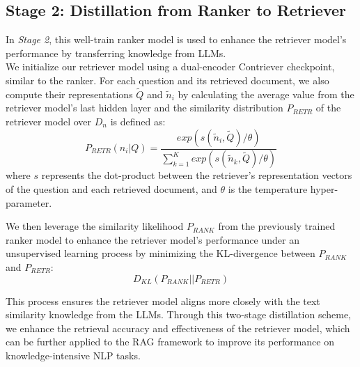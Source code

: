 \subsection{Stage 2: Distillation from Ranker to Retriever}
\label{sec:3-3}
In \textit{Stage 2}, this well-train ranker model is used to enhance the retriever model's performance by transferring knowledge from LLMs.\\
We initialize our retriever model using a dual-encoder Contriever checkpoint, similar to the ranker.
For each question and its retrieved document, we also compute their representations $\widetilde{Q}$ and $\widetilde{n}_i$ by calculating the average value from the retriever model's last hidden layer and the similarity distribution $P_{RETR}$ of the retriever model over $D_n$ is defined as:
\begin{equation}
    P_{RETR}(n_i|Q) = \frac{exp(s(\widetilde{n}_i, \widetilde{Q})/\theta)}{\sum_{k=1}^Kexp(s(\widetilde{n}_k, \widetilde{Q})/\theta)}
\end{equation}
where $s$ represents the dot-product between the retriever's representation vectors of the question and each retrieved document, and $\theta$ is the temperature hyper-parameter.

We then leverage the similarity likelihood $P_{RANK}$ from the previously trained ranker model to enhance the retriever model's performance under an unsupervised learning process by minimizing the KL-divergence between $P_{RANK}$ and $P_{RETR}$:
\begin{equation}
    D_{KL}(P_{RANK}||P_{RETR})
\end{equation}

This process ensures the retriever model aligns more closely with the text similarity knowledge from the LLMs.
Through this two-stage distillation scheme, we enhance the retrieval accuracy and effectiveness of the retriever model, which can be further applied to the RAG framework to improve its performance on knowledge-intensive NLP tasks.